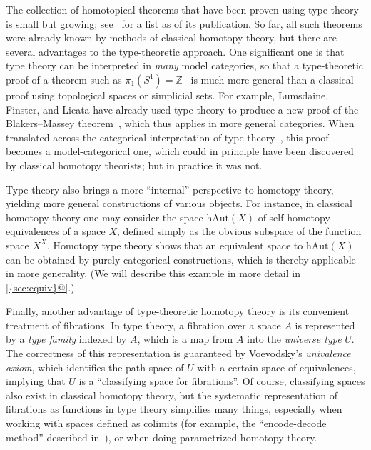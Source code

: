 \documentclass{amsart}
\theoremstyle{remark}
{\newtheorem{{rmk}}[thm]{{Remark}}}
\numberwithin{equation}{section}
\theoremstyle{plain}
\begin{document}
The collection of homotopical theorems that have been proven using type theory is small but growing; see~\cite[Chapter 8]{hottbook} for a list as of its publication.
So far, all such theorems were already known by methods of classical homotopy theory, but there are several advantages to the type-theoretic approach.
One significant one is that type theory can be interpreted in \emph{many} model categories, so that a type-theoretic proof of a theorem such as $\pi_1(S^1)=\mathbb{Z}$~\cite{ls:pi1s1} is much more general than a classical proof using topological spaces or simplicial sets.
For example, Lumsdaine, Finster, and Licata have already used type theory to produce a new proof of the Blakers--Massey theorem~\cite{favonia:blakers-massey-agda}, which thus applies in more general categories.
When translated across the categorical interpretation of type theory~\cite{rezk:hott-blakersmassey}, this proof becomes a model-categorical one, which could in principle have been discovered by classical homotopy theorists; but in practice it was not.

Type theory also brings a more ``internal'' perspective to homotopy theory, yielding more general constructions of various objects.
For instance, in classical homotopy theory one may consider the space $\mathrm{hAut}(X)$ of self-homotopy equivalences of a space $X$, defined simply as the obvious subspace of the function space $X^X$.
Homotopy type theory shows that an equivalent space to $\mathrm{hAut}(X)$ can be obtained by purely categorical constructions, which is thereby applicable in more generality.
(We will describe this example in more detail in {\ref{{sec:equiv}@}}.)

Finally, another advantage of type-theoretic homotopy theory is its convenient treatment of fibrations.
In type theory, a fibration over a space $A$ is represented by a \emph{type family} indexed by $A$, which is a map from $A$ into the \emph{universe type} $U$.
The correctness of this representation is guaranteed by Voevodsky's \emph{univalence axiom}, which identifies the path space of $U$ with a certain space of equivalences, implying that $U$ is a ``classifying space for fibrations''.
Of course, classifying spaces also exist in classical homotopy theory, but the systematic representation of fibrations as functions in type theory simplifies many things, especially when working with spaces defined as colimits (for example, the ``encode-decode method'' described in~\cite[Chapter 8]{hottbook}), or when doing parametrized homotopy theory.
\end{document}
